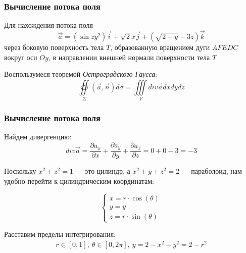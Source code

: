 \begin{frame}\frametitle{Вычисление потока поля}
  Для нахождения потока поля
  \begin{equation*}
		\vec a = (\sin zy^2) \vec i + \sqrt{2} x \vec j + (\sqrt{2+y} -3z) \vec k
	\end{equation*}
		      через боковую поверхность тела \(T\), образованную вращением дуги \(AFEDC\)
		      вокруг оси \(Oy\), в направлении внешней нормали поверхности тела \(T\)
 

  Воспользумеся теоремой \textit{Остроградского-Гаусса}:
  \begin{equation*}
    \oiint\limits_{\Sigma}\left( \vec {a}, \vec {n} \right) d\sigma = \iiint\limits_V div \vec {a} dxdydz 
  \end{equation*}
\end{frame}


\begin{frame}\frametitle{Вычисление потока поля}
  Найдем дивергенцию:
  \begin{equation*}
    div \vec a = \frac{\partial a_x}{\partial x} +  \frac{\partial a_y}{\partial y} +  \frac{\partial a_z}{\partial z} = 0 + 0 - 3 = -3 
	\end{equation*}

  Поскольку $x^2 + z^2 = 1$ — это цилиндр, а $x^2 + y + z^2 = 2$ — параболоид, нам удобно перейти к цилиндрическим координатам:

  \begin{equation*}
    \begin{cases}
      x = r \cdot \cos(\theta) \\
      y = y \\
      z = r \cdot \sin(\theta)
    \end{cases}
  \end{equation*}

  Расставим пределы интегрирования:
  \begin{align*}
    r \in [0, 1], \
    \theta \in [0, 2\pi], \ 
    y = 2 - x^2 - y^2 = 2 - r^2
  \end{align*}
  \end{frame}


